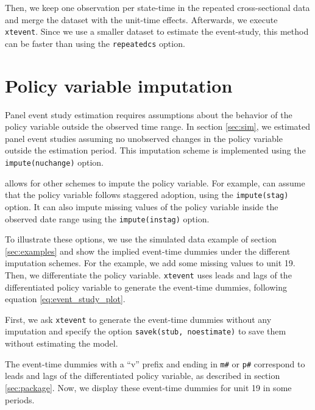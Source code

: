 \documentclass[12pt]{article}
\begin{document}
Then, we keep one observation per state-time in the repeated cross-sectional data and merge the dataset with the unit-time effects.
Afterwards, we execute \texttt{xtevent}.
Since we use a smaller dataset to estimate the event-study, this method can be faster than using the \texttt{repeatedcs} option.

\begin{stlog}
\nullskip
\end{stlog}

\section{Policy variable imputation}
\label{sec:impute}

Panel event study estimation requires assumptions about the behavior of the policy variable outside the observed time range.
In section \ref{sec:sim}, we estimated panel event studies assuming no unobserved changes in the policy variable outside the estimation period.
This imputation scheme is implemented using the \texttt{impute(nuchange)} option.

\xtevent allows for other schemes to impute the policy variable.
For example, \xtevent can assume that the policy variable follows staggered adoption, using the \texttt{impute(stag)} option.
It can also impute missing values of the policy variable inside the observed date range using the \texttt{impute(instag)} option.

To illustrate these options, we use the simulated data example of section \ref{sec:examples} and show the implied event-time dummies under the different imputation schemes.
For the example, we add some missing values to unit 19.
Then, we differentiate the policy variable.
\texttt{xtevent} uses leads and lags of the differentiated policy variable to generate the event-time dummies, following equation \eqref{eq:event_study_plot}.

First, we ask \texttt{xtevent} to generate the event-time dummies without any imputation and specify the option \texttt{savek(stub, noestimate)} to save them without estimating the model.

\begin{stlog}
	\nullskip
\end{stlog}

The event-time dummies with a ``v'' prefix and ending in \texttt{m\#} or \texttt{p\#} correspond to leads and lags of the differentiated policy variable, as described in section \ref{sec:package}.
Now, we display these event-time dummies for unit 19 in some periods.
\end{document}
